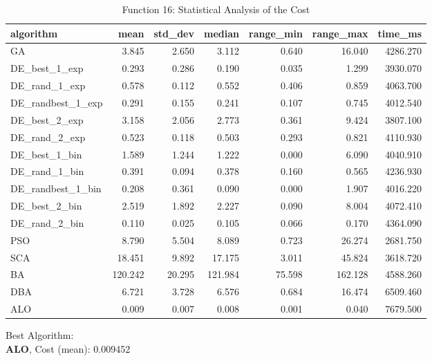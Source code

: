 \documentclass[12pt]{article}
\begin{document}
\begin{table}[H]
    \centering
    \footnotesize
    \begin{adjustbox}{width=1\textwidth}
        \begin{tabular}{lrrrrrr}
            \toprule
            algorithm &    mean &  std\_dev &  median &  range\_min &  range\_max &  time\_ms \\
            \midrule
            GA & 3.845 & 2.650 & 3.112 & 0.640 & 16.040 & 4286.270 \\
            DE\_best\_1\_exp & 0.293 & 0.286 & 0.190 & 0.035 & 1.299 & 3930.070 \\
            DE\_rand\_1\_exp & 0.578 & 0.112 & 0.552 & 0.406 & 0.859 & 4063.700 \\
            DE\_randbest\_1\_exp & 0.291 & 0.155 & 0.241 & 0.107 & 0.745 & 4012.540 \\
            DE\_best\_2\_exp & 3.158 & 2.056 & 2.773 & 0.361 & 9.424 & 3807.100 \\
            DE\_rand\_2\_exp & 0.523 & 0.118 & 0.503 & 0.293 & 0.821 & 4110.930 \\
            DE\_best\_1\_bin & 1.589 & 1.244 & 1.222 & 0.000 & 6.090 & 4040.910 \\
            DE\_rand\_1\_bin & 0.391 & 0.094 & 0.378 & 0.160 & 0.565 & 4236.930 \\
            DE\_randbest\_1\_bin & 0.208 & 0.361 & 0.090 & 0.000 & 1.907 & 4016.220 \\
            DE\_best\_2\_bin & 2.519 & 1.892 & 2.227 & 0.090 & 8.004 & 4072.410 \\
            DE\_rand\_2\_bin & 0.110 & 0.025 & 0.105 & 0.066 & 0.170 & 4364.090 \\
            PSO & 8.790 & 5.504 & 8.089 & 0.723 & 26.274 & 2681.750 \\
            SCA & 18.451 & 9.892 & 17.175 & 3.011 & 45.824 & 3618.720 \\
            BA & 120.242 & 20.295 & 121.984 & 75.598 & 162.128 & 4588.260 \\
            DBA & 6.721 & 3.728 & 6.576 & 0.684 & 16.474 & 6509.460 \\
            ALO & 0.009 & 0.007 & 0.008 & 0.001 & 0.040 & 7679.500 \\
            \bottomrule
        \end{tabular}
        
        
    \end{adjustbox}
    \caption{Function 16: Statistical Analysis of the Cost} 
\end{table}
Best Algorithm: \\
\textbf{ALO}, Cost (mean): 0.009452\\
\newpage
\end{document}
